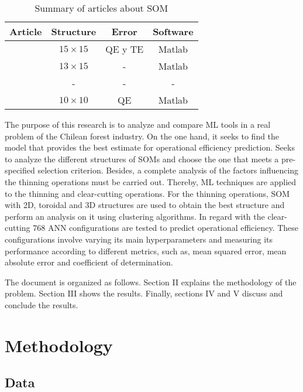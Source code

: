 \documentclass[conference]{IEEEtran}
\begin{document}
\begin{table}[!ht]
\renewcommand{\arraystretch}{1.3}
\caption{Summary of articles about SOM}
\label{table02}
\centering
\begin{tabular}{c || c || c || c}
\hline
\bfseries Article & \bfseries Structure & \bfseries Error & \bfseries Software \\
\hline\hline

\cite{devoloping_herbicide_sachini} 		& $15\times15$ & QE y TE	 & Matlab\\
\cite{the_self_organazing_mokarram} 	& $13\times15$ 	& -	 & Matlab \\  
\cite{self_organazing_venkatesh}   		& - & - 	 & - 	\\
\cite{artificial_neural_Waidyarathne} 		& $10\times10$ & QE & Matlab\\ 
\hline
\end{tabular}
\end{table}

The purpose of this research is to analyze and compare ML tools in a real problem of the Chilean forest industry. On the one hand, it seeks to find the model that provides the best estimate for operational efficiency prediction. Seeks to analyze the different structures of SOMs and choose the one that meets a pre-specified selection criterion. Besides, a complete analysis of the factors influencing the thinning operations must be carried out. Thereby, ML techniques are applied to the thinning and clear-cutting operations. For the thinning operations, SOM with 2D, toroidal and 3D structures are used to obtain the best structure and perform an analysis on it using clustering algorithms.  In regard with the clear-cutting 768 ANN configurations are tested to predict operational efficiency. These configurations involve varying its main hyperparameters and measuring its performance according to different metrics, such as, mean squared error, mean absolute error and coefficient of determination.

The document is organized as follows. Section II explains the methodology of the problem. Section III shows the results. Finally, sections IV and V discuss and conclude the results.

\section{Methodology}

\subsection{Data}
\end{document}
